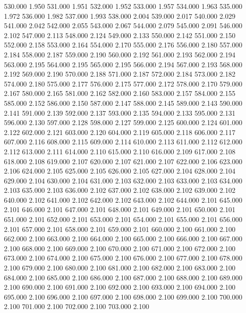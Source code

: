 530.000 1.950 
531.000 1.951 
532.000 1.952 
533.000 1.957 
534.000 1.963 
535.000 1.972 
536.000 1.982 
537.000 1.993 
538.000 2.004 
539.000 2.017 
540.000 2.029 
541.000 2.042 
542.000 2.055 
543.000 2.067 
544.000 2.079 
545.000 2.091 
546.000 2.102 
547.000 2.113 
548.000 2.124 
549.000 2.133 
550.000 2.142 
551.000 2.150 
552.000 2.158 
553.000 2.164 
554.000 2.170 
555.000 2.176 
556.000 2.180 
557.000 2.184 
558.000 2.187 
559.000 2.190 
560.000 2.192 
561.000 2.193 
562.000 2.194 
563.000 2.195 
564.000 2.195 
565.000 2.195 
566.000 2.194 
567.000 2.193 
568.000 2.192 
569.000 2.190 
570.000 2.188 
571.000 2.187 
572.000 2.184 
573.000 2.182 
574.000 2.180 
575.000 2.177 
576.000 2.175 
577.000 2.172 
578.000 2.170 
579.000 2.167 
580.000 2.165 
581.000 2.162 
582.000 2.160 
583.000 2.157 
584.000 2.155 
585.000 2.152 
586.000 2.150 
587.000 2.147 
588.000 2.145 
589.000 2.143 
590.000 2.141 
591.000 2.139 
592.000 2.137 
593.000 2.135 
594.000 2.133 
595.000 2.131 
596.000 2.130 
597.000 2.128 
598.000 2.127 
599.000 2.125 
600.000 2.124 
601.000 2.122 
602.000 2.121 
603.000 2.120 
604.000 2.119 
605.000 2.118 
606.000 2.117 
607.000 2.116 
608.000 2.115 
609.000 2.114 
610.000 2.113 
611.000 2.112 
612.000 2.112 
613.000 2.111 
614.000 2.110 
615.000 2.110 
616.000 2.109 
617.000 2.108 
618.000 2.108 
619.000 2.107 
620.000 2.107 
621.000 2.107 
622.000 2.106 
623.000 2.106 
624.000 2.105 
625.000 2.105 
626.000 2.105 
627.000 2.104 
628.000 2.104 
629.000 2.104 
630.000 2.104 
631.000 2.103 
632.000 2.103 
633.000 2.103 
634.000 2.103 
635.000 2.103 
636.000 2.102 
637.000 2.102 
638.000 2.102 
639.000 2.102 
640.000 2.102 
641.000 2.102 
642.000 2.102 
643.000 2.102 
644.000 2.101 
645.000 2.101 
646.000 2.101 
647.000 2.101 
648.000 2.101 
649.000 2.101 
650.000 2.101 
651.000 2.101 
652.000 2.101 
653.000 2.101 
654.000 2.101 
655.000 2.101 
656.000 2.101 
657.000 2.101 
658.000 2.101 
659.000 2.101 
660.000 2.100 
661.000 2.100 
662.000 2.100 
663.000 2.100 
664.000 2.100 
665.000 2.100 
666.000 2.100 
667.000 2.100 
668.000 2.100 
669.000 2.100 
670.000 2.100 
671.000 2.100 
672.000 2.100 
673.000 2.100 
674.000 2.100 
675.000 2.100 
676.000 2.100 
677.000 2.100 
678.000 2.100 
679.000 2.100 
680.000 2.100 
681.000 2.100 
682.000 2.100 
683.000 2.100 
684.000 2.100 
685.000 2.100 
686.000 2.100 
687.000 2.100 
688.000 2.100 
689.000 2.100 
690.000 2.100 
691.000 2.100 
692.000 2.100 
693.000 2.100 
694.000 2.100 
695.000 2.100 
696.000 2.100 
697.000 2.100 
698.000 2.100 
699.000 2.100 
700.000 2.100 
701.000 2.100 
702.000 2.100 
703.000 2.100 
